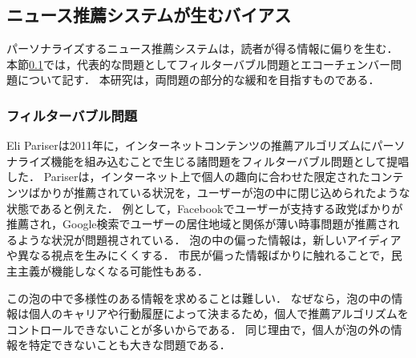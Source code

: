 \documentclass[12pt,a4j]{jreport}
\begin{document}
\subsection{ニュース推薦システムが生むバイアス}
\label{biases_generated_by_nrs}
パーソナライズするニュース推薦システムは，読者が得る情報に偏りを生む．
本節\ref{biases_generated_by_nrs}では，代表的な問題としてフィルターバブル問題とエコーチェンバー問題について記す．
本研究は，両問題の部分的な緩和を目指すものである．


\subsubsection{フィルターバブル問題}
Eli Pariserは2011年に，インターネットコンテンツの推薦アルゴリズムにパーソナライズ機能を組み込むことで生じる諸問題をフィルターバブル問題として提唱した\cite{pariser_beware_nodate}\cite{bruns_filter_2019}．
Pariserは，インターネット上で個人の趣向に合わせた限定されたコンテンツばかりが推薦されている状況を，ユーザーが泡の中に閉じ込められたような状態であると例えた．
例として，Facebookでユーザーが支持する政党ばかりが推薦され，Google検索でユーザーの居住地域と関係が薄い時事問題が推薦されるような状況が問題視されている．
泡の中の偏った情報は，新しいアイディアや異なる視点を生みにくくする．
市民が偏った情報ばかりに触れることで，民主主義が機能しなくなる可能性もある．

この泡の中で多様性のある情報を求めることは難しい．
なぜなら，泡の中の情報は個人のキャリアや行動履歴によって決まるため，個人で推薦アルゴリズムをコントロールできないことが多いからである．
同じ理由で，個人が泡の外の情報を特定できないことも大きな問題である．

\end{document}
